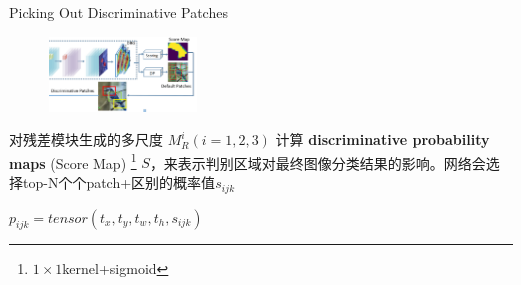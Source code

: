 \begin{frame}{Picking Out Discriminative Patches} 
    \begin{multicols}{2}
        \begin{figure}
            \centering
            \includegraphics[width=0.35\textwidth]{docs/paperReading/CDL/dp.png}
        \end{figure}
        对残差模块生成的多尺度 $M_R^i(i=1,2,3)$ 计算 \textbf{discriminative probability maps} (Score Map) \footnote{$1\times 1$kernel+sigmoid} $S$，来表示判别区域对最终图像分类结果的影响。网络会选择top-N个个patch+区别的概率值$s_{ijk}$
        
        $p_{ijk}=tensor(t_x,t_y,t_w,t_h,s_{ijk})$
\end{multicols}
    
\end{frame}



